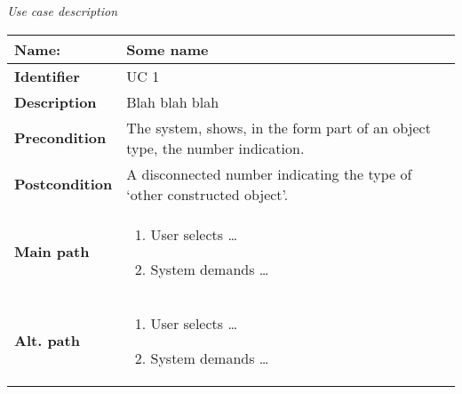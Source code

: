\documentclass{article}
\newcommand\addrow[2]{#1 &#2\\ }
\newcommand\addheading[2]{#1 &#2\\ \hline}
\newcommand\tabularhead{\begin{tabular}{lp{10cm}}
\hline
}
\newcommand\addmulrow[2]{ \begin{minipage}[t][][t]{2.5cm}#1\end{minipage}%
   &\begin{minipage}[t][][t]{10cm}
    \begin{enumerate} #2   \end{enumerate}
    \end{minipage}\\ }
\newenvironment{usecase}{\tabularhead}
{\hline\end{tabular}}
\begin{document}
{\Large\textit{Use case description}} \\
\begin{usecase}
  \addheading{\textbf{Name:}}{Some name}
  \addheading{\textbf{Identifier}}{UC 1}
  \addrow{\textbf{Description}}{Blah blah blah}
  \addrow{\textbf{Precondition}}{The system, shows, in the form part of an object type, the number   indication.}
  \addrow{\textbf{Postcondition}}{A disconnected number indicating the type of `other constructed object'.}
  \addmulrow{\textbf{Main path}}{
  	\item User selects \ldots
    \item System demands \ldots}
  \addmulrow{\textbf{Alt. path}}{
  	\item User selects \ldots
    \item System demands \ldots}
\end{usecase}
\end{document}
